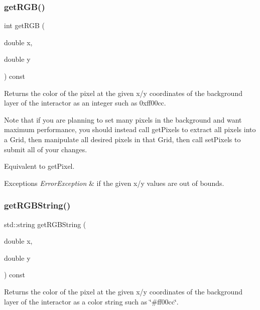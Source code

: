 \subsubsection{\texorpdfstring{get\+R\+G\+B()}{getRGB()}}
{\footnotesize\ttfamily int get\+R\+GB (\begin{DoxyParamCaption}\item[{double}]{x,  }\item[{double}]{y }\end{DoxyParamCaption}) const\hspace{0.3cm}{\ttfamily [virtual]}}



Returns the color of the pixel at the given x/y coordinates of the background layer of the interactor as an integer such as 0xff00cc. 

Note that if you are planning to set many pixels in the background and want maximum performance, you should instead call get\+Pixels to extract all pixels into a Grid, then manipulate all desired pixels in that Grid, then call set\+Pixels to submit all of your changes.

Equivalent to get\+Pixel.


\begin{DoxyExceptions}{Exceptions}
{\em Error\+Exception} & if the given x/y values are out of bounds. \\
\hline
\end{DoxyExceptions}
\mbox{\label{classGDrawingSurface_a456d3582acc3544f37d939f5cb8802fe}} 
\subsubsection{\texorpdfstring{get\+R\+G\+B\+String()}{getRGBString()}}
{\footnotesize\ttfamily std\+::string get\+R\+G\+B\+String (\begin{DoxyParamCaption}\item[{double}]{x,  }\item[{double}]{y }\end{DoxyParamCaption}) const\hspace{0.3cm}{\ttfamily [virtual]}}



Returns the color of the pixel at the given x/y coordinates of the background layer of the interactor as a color string such as \char`\"{}\#ff00cc\char`\"{}. 

